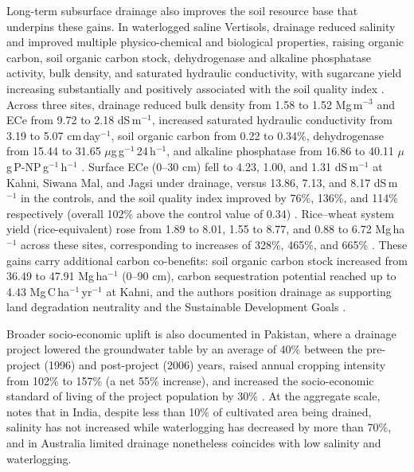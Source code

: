 \documentclass[11pt]{article}
\begin{document}
Long-term subsurface drainage also improves the soil resource base that underpins these gains. In waterlogged saline Vertisols, drainage reduced salinity and improved multiple physico-chemical and biological properties, raising organic carbon, soil organic carbon stock, dehydrogenase and alkaline phosphatase activity, bulk density, and saturated hydraulic conductivity, with sugarcane yield increasing substantially and positively associated with the soil quality index \parencite{Mukhopadhyay2023}. Across three sites, drainage reduced bulk density from 1.58 to 1.52 Mg\,m$^{-3}$ and ECe from 9.72 to 2.18 dS\,m$^{-1}$, increased saturated hydraulic conductivity from 3.19 to 5.07 cm\,day$^{-1}$, soil organic carbon from 0.22 to 0.34\%, dehydrogenase from 15.44 to 31.65 $\mu$g\,g$^{-1}$\,24\,h$^{-1}$, and alkaline phosphatase from 16.86 to 40.11 $\mu$g\,P-NP\,g$^{-1}$\,h$^{-1}$ \parencite{Mukhopadhyay2023b}. Surface ECe (0--30 cm) fell to 4.23, 1.00, and 1.31 dS\,m$^{-1}$ at Kahni, Siwana Mal, and Jagsi under drainage, versus 13.86, 7.13, and 8.17 dS\,m$^{-1}$ in the controls, and the soil quality index improved by 76\%, 136\%, and 114\% respectively (overall 102\% above the control value of 0.34) \parencite{Mukhopadhyay2023b}. Rice--wheat system yield (rice-equivalent) rose from 1.89 to 8.01, 1.55 to 8.77, and 0.88 to 6.72 Mg\,ha$^{-1}$ across these sites, corresponding to increases of 328\%, 465\%, and 665\% \parencite{Mukhopadhyay2023b}. These gains carry additional carbon co-benefits: soil organic carbon stock increased from 36.49 to 47.91 Mg\,ha$^{-1}$ (0--90 cm), carbon sequestration potential reached up to 4.43 Mg\,C\,ha$^{-1}$\,yr$^{-1}$ at Kahni, and the authors position drainage as supporting land degradation neutrality and the Sustainable Development Goals \parencite{Mukhopadhyay2023b,Mukhopadhyay2023}.

Broader socio-economic uplift is also documented in Pakistan, where a drainage project lowered the groundwater table by an average of 40\% between the pre-project (1996) and post-project (2006) years, raised annual cropping intensity from 102\% to 157\% (a net 55\% increase), and increased the socio-economic standard of living of the project population by 30\% \parencite{Ghumman2011}. At the aggregate scale, \textcite{Valipour2014} notes that in India, despite less than 10\% of cultivated area being drained, salinity has not increased while waterlogging has decreased by more than 70\%, and in Australia limited drainage nonetheless coincides with low salinity and waterlogging.
\end{document}
